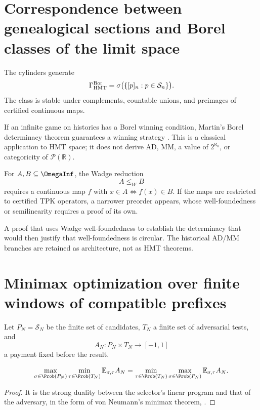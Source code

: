 \section{Correspondence between genealogical sections and Borel classes of the limit space}

The cylinders generate
\[
 \Gamma_{\rm HMT}^{\rm Bor}
 =
 \sigma\bigl(\{[p]_n:p\in\mathcal S_n\}\bigr).
\]
The class is stable under complements, countable unions, and preimages of certified continuous maps.

If an infinite game on histories has a Borel winning condition,
Martin's Borel determinacy theorem guarantees a winning strategy
\citep{martin1975}. This is a classical application to HMT space;
it does not derive AD, MM, a value of \(2^{\aleph_0}\), or categoricity of
\(\mathcal P(\mathbb R)\).

For \(A,B\subseteq\OmegaInf\), the Wadge reduction
\[
 A\le_WB
\]
requires a continuous map \(f\) with \(x\in A\iff f(x)\in B\). If the
maps are restricted to certified TPK operators, a narrower preorder appears,
whose well-foundedness or semilinearity requires a proof of its own.

\begin{remark}
A proof that uses Wadge well-foundedness to establish the
determinacy that would then justify that well-foundedness is circular. The
historical AD/MM branches are retained as architecture, not as HMT theorems.
\end{remark}

\section{Minimax optimization over finite windows of compatible prefixes}

Let \(P_N=\mathcal S_N\) be the finite set of candidates, \(T_N\) a finite set
of adversarial tests, and
\[
  A_N:P_N\times T_N\to[-1,1]
\]
a payment fixed before the result.

\begin{theorem}
\[
 \max_{\sigma\in\Prob(P_N)}
 \min_{\tau\in\Prob(T_N)}
 \mathbb E_{\sigma,\tau}A_N
 =
 \min_{\tau\in\Prob(T_N)}
 \max_{\sigma\in\Prob(P_N)}
 \mathbb E_{\sigma,\tau}A_N.
\]
\end{theorem}

\begin{proof}
It is the strong duality between the selector's linear program and that of the
adversary, in the form of von Neumann's minimax theorem,
\citep{vonneumann1928}.
\end{proof}

